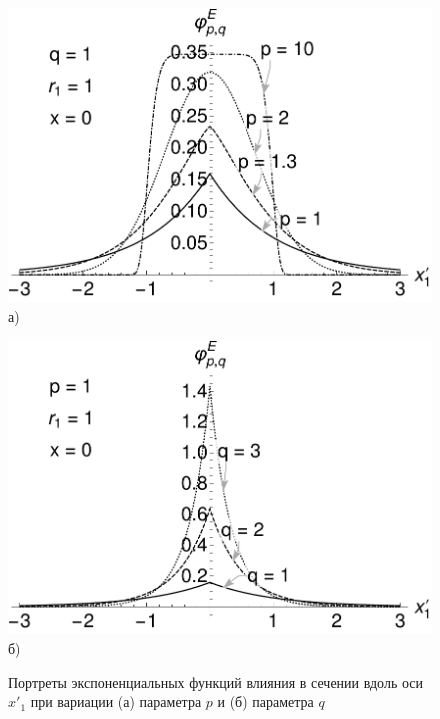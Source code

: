 \begin{figure}[ht]
    \begin{minipage}[b][][b]{0.49\linewidth}\centering
        \includegraphics[width=\linewidth]{pics/ExponentialInfluenceP.pdf} \\ а)
    \end{minipage}
    \hfill
    \begin{minipage}[b][][b]{0.49\linewidth}\centering
        \includegraphics[width=\linewidth]{pics/ExponentialInfluenceQ.pdf} \\ б)
    \end{minipage}
    \caption{Портреты экспоненциальных функций влияния в сечении вдоль оси $x'_1$ при вариации (а) параметра $p$ и (б) параметра $q$}
    \label{fig:ExponentialInfluencePortrait}
\end{figure}

